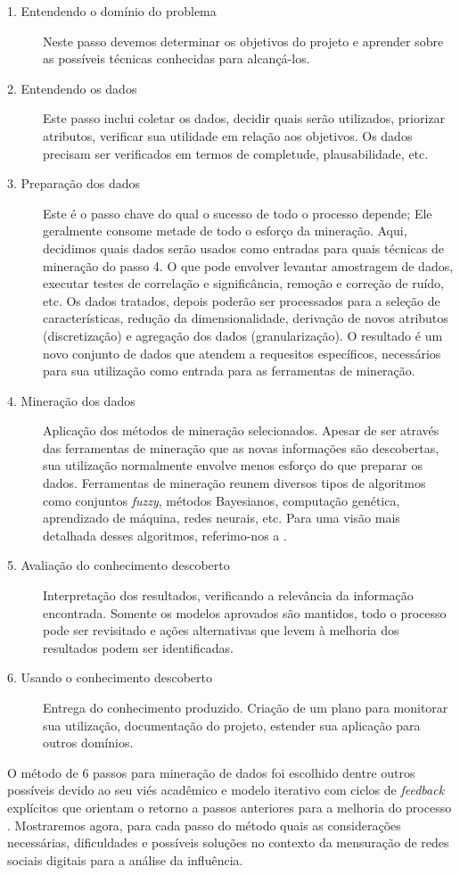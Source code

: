 \begin{description}
\item[1. Entendendo o domínio do problema]Neste passo devemos determinar os
objetivos do projeto e aprender sobre as possíveis técnicas conhecidas
para alcançá-los.
\item[2. Entendendo os dados]Este passo inclui coletar os dados, decidir quais
serão utilizados, priorizar atributos, verificar sua utilidade em relação aos
objetivos. Os dados precisam ser verificados em termos de completude,
plausabilidade, etc.
\item[3. Preparação dos dados]Este é o passo chave do qual o sucesso de todo o
processo depende; Ele geralmente consome metade de todo o esforço da mineração.
Aqui, decidimos quais dados serão usados como entradas para quais técnicas de
mineração do passo 4. O que pode envolver levantar amostragem de dados, executar
testes de correlação e significância, remoção e correção de ruído, etc. Os dados
tratados, depois poderão ser processados para a seleção de características,
redução da dimensionalidade, derivação de novos atributos (discretização) e
agregação dos dados (granularização). O resultado é um novo conjunto de dados
que atendem a requesitos específicos, necessários para sua utilização como
entrada para as ferramentas de mineração.
\item[4. Mineração dos dados]Aplicação dos métodos de mineração selecionados.
Apesar de ser através das ferramentas de mineração que as novas informações
são descobertas, sua utilização normalmente envolve menos esforço do que
preparar os dados. Ferramentas de mineração reunem diversos tipos de algoritmos
como conjuntos \emph{fuzzy}, métodos Bayesianos, computação genética,
aprendizado de máquina, redes neurais, etc. Para uma visão mais detalhada desses
algoritmos, referimo-nos a \cite{JiaweiHan2006}.
\item[5. Avaliação do conhecimento descoberto]Interpretação dos
resultados, verificando a relevância da informação encontrada. Somente os
modelos aprovados são mantidos, todo o processo pode ser revisitado e ações
alternativas que levem à melhoria dos resultados podem ser identificadas.
\item[6. Usando o conhecimento descoberto]Entrega do conhecimento produzido.
Criação de um plano para monitorar sua utilização, documentação do projeto,
estender sua aplicação para outros domínios.
\end{description}

O método de 6 passos para mineração de dados foi escolhido dentre outros
possíveis devido ao seu viés acadêmico e modelo iterativo com ciclos de
\emph{feedback} explícitos que orientam o retorno a passos anteriores para a
melhoria do processo \citep{KURGAN2006}. Mostraremos agora, para cada passo do
método quais as considerações necessárias, dificuldades e possíveis soluções no
contexto da mensuração de redes sociais digitais para a análise da influência.

